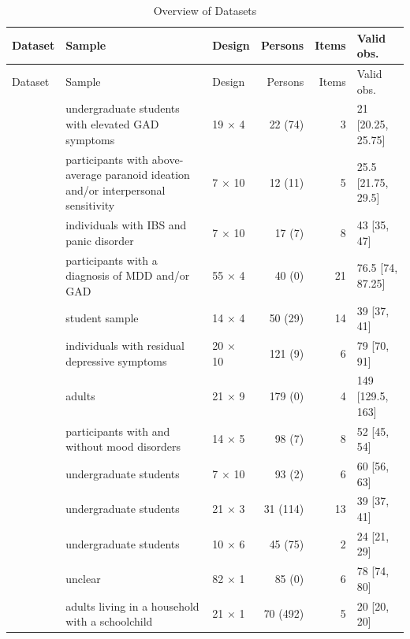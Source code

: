\begin{landscape}
\small
\renewcommand{\arraystretch}{1.2}
\begin{xltabular}{\linewidth}{@{}>{\raggedright\arraybackslash}p{7.5cm} >{\raggedright\arraybackslash}X l r r l@{}}
\caption{Overview of Datasets}
\label{tab:datasets} \\
\toprule
Dataset & Sample & Design & Persons & Items & Valid obs. \\
\midrule
\endfirsthead
\toprule
Dataset & Sample & Design & Persons & Items & Valid obs. \\
\midrule
\endhead
\bottomrule
\endfoot
\textcite{bosley2020} & undergraduate students with elevated GAD symptoms & 19 $\times$ 4 & 22 (74) & 3 & 21 [20.25, 25.75] \\
\textcite{contreras2020} & participants with above-average paranoid ideation and/or interpersonal sensitivity & 7 $\times$ 10 & 12 (11) & 5 & 25.5 [21.75, 29.5] \\
\textcite{drukker2020} & individuals with IBS and panic disorder & 7 $\times$ 10 & 17 (7) & 8 & 43 [35, 47] \\
\textcite{fisher2017} & participants with a diagnosis of MDD and/or GAD & 55 $\times$ 4 & 40 (0) & 21 & 76.5 [74, 87.25] \\
\textcite{fried2022} & student sample & 14 $\times$ 4 & 50 (29) & 14 & 39 [37, 41] \\
\textcite{geschwind2011,bringmann2013} & individuals with residual depressive symptoms & 20 $\times$ 10 & 121 (9) & 6 & 79 [70, 91] \\
\textcite{grommisch2020} & adults & 21 $\times$ 9 & 179 (0) & 4 & 149 [129.5, 163] \\
\textcite{kullar2024} & participants with and without mood disorders & 14 $\times$ 5 & 98 (7) & 8 & 52 [45, 54] \\
\textcite{kuppens2012,bringmannAssessingTemporalEmotion2016} & undergraduate students & 7 $\times$ 10 & 93 (2) & 6 & 60 [56, 63] \\
\textcite{marian2023} & undergraduate students & 21 $\times$ 3 & 31 (114) & 13 & 39 [37, 41] \\
\textcite{merolla2024} & undergraduate students & 10 $\times$ 6 & 45 (75) & 2 & 24 [21, 29] \\
\textcite{nestler2022} & unclear & 82 $\times$ 1 & 85 (0) & 6 & 78 [74, 80] \\
\textcite{neubauer2021} & adults living in a household with a schoolchild & 21 $\times$ 1 & 70 (492) & 5 & 20 [20, 20] \\

\end{xltabular}
\end{landscape}
